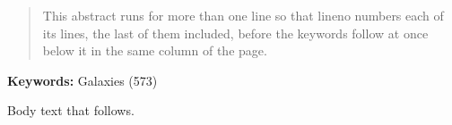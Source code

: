 \documentclass{article}
\begin{document}
\begin{quote}
This abstract runs for more than one line so that lineno numbers each of
its lines, the last of them included, before the keywords follow at
once below it in the same column of the page.
\end{quote}
\noindent\textbf{Keywords:} Galaxies (573)
\par
Body text that follows.
\end{document}

